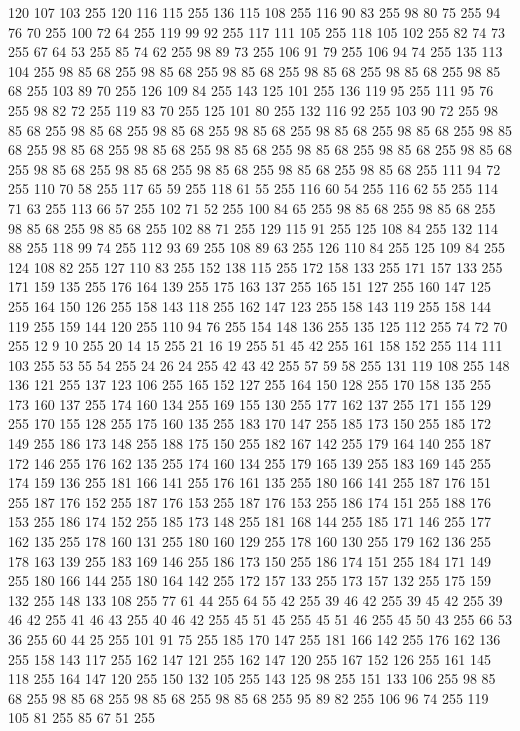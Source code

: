 120 107 103 255 120 116 115 255 136 115 108 255 116 90 83 255 98 80 75 255 94 76 70 255 100 72 64 255 119 99 92 255 117 111 105 255 118 105 102 255 82 74 73 255 67 64 53 255 85 74 62 255 98 89 73 255 106 91 79 255 106 94 74 255 135 113 104 255 98 85 68 255 98 85 68 255 98 85 68 255 98 85 68 255 98 85 68 255 98 85 68 255 103 89 70 255 126 109 84 255 143 125 101 255 136 119 95 255 111 95 76 255 98 82 72 255 119 83 70 255 125 101 80 255 132 116 92 255 103 90 72 255 98 85 68 255 98 85 68 255 98 85 68 255 98 85 68 255 98 85 68 255 98 85 68 255 98 85 68 255 98 85 68 255 98 85 68 255 98 85 68 255 98 85 68 255 98 85 68 255 98 85 68 255 98 85 68 255 98 85 68 255 98 85 68 255 98 85 68 255 98 85 68 255 111 94 72 255 110 70 58 255 117 65 59 255 118 61 55 255 116 60 54 255 116 62 55 255 114 71 63 255 113 66 57 255 102 71 52 255 100 84 65 255 98 85 68 255 98 85 68 255 98 85 68 255
98 85 68 255 102 88 71 255 129 115 91 255 125 108 84 255 132 114 88 255 118 99 74 255 112 93 69 255 108 89 63 255 126 110 84 255 125 109 84 255 124 108 82 255 127 110 83 255 152 138 115 255 172 158 133 255 171 157 133 255 171 159 135 255 176 164 139 255 175 163 137 255 165 151 127 255 160 147 125 255 164 150 126 255 158 143 118 255 162 147 123 255 158 143 119 255 158 144 119 255 159 144 120 255 110 94 76 255 154 148 136 255 135 125 112 255 74 72 70 255 12 9 10 255 20 14 15 255 21 16 19 255 51 45 42 255 161 158 152 255 114 111 103 255 53 55 54 255 24 26 24 255 42 43 42 255 57 59 58 255 131 119 108 255 148 136 121 255 137 123 106 255 165 152 127 255 164 150 128 255 170 158 135 255 173 160 137 255 174 160 134 255 169 155 130 255 177 162 137 255 171 155 129 255 170 155 128 255 175 160 135 255 183 170 147 255 185 173 150 255 185 172 149 255 186 173 148 255 188 175 150 255 182 167 142 255 179 164 140 255 187 172 146 255 176 162 135 255 174 160 134 255 179 165 139 255
183 169 145 255 174 159 136 255 181 166 141 255 176 161 135 255 180 166 141 255 187 176 151 255 187 176 152 255 187 176 153 255 187 176 153 255 186 174 151 255 188 176 153 255 186 174 152 255 185 173 148 255 181 168 144 255 185 171 146 255 177 162 135 255 178 160 131 255 180 160 129 255 178 160 130 255 179 162 136 255 178 163 139 255 183 169 146 255 186 173 150 255 186 174 151 255 184 171 149 255 180 166 144 255 180 164 142 255 172 157 133 255 173 157 132 255 175 159 132 255 148 133 108 255 77 61 44 255 64 55 42 255 39 46 42 255 39 45 42 255 39 46 42 255 41 46 43 255 40 46 42 255 45 51 45 255 45 51 46 255 45 50 43 255 66 53 36 255 60 44 25 255 101 91 75 255 185 170 147 255 181 166 142 255 176 162 136 255 158 143 117 255 162 147 121 255 162 147 120 255 167 152 126 255 161 145 118 255 164 147 120 255 150 132 105 255 143 125 98 255 151 133 106 255 98 85 68 255 98 85 68 255 98 85 68 255 98 85 68 255 95 89 82 255 106 96 74 255 119 105 81 255 85 67 51 255
